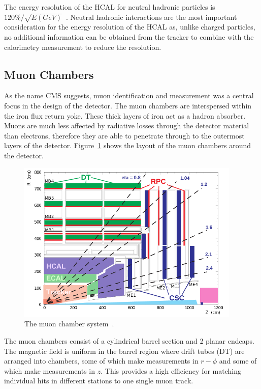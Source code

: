 The energy resolution of the HCAL for neutral hadronic particles is $120\%/\sqrt{E (GeV)}$~\cite{Beaudette:2014cea}. Neutral hadronic interactions are the most important consideration for the energy resolution of the HCAL as, unlike charged particles, no additional information can be obtained from the tracker to combine with the calorimetry measurement to reduce the resolution.

\subsection{Muon Chambers}
As the name CMS suggests, muon identification and measurement was a central focus in the design of the detector. The muon chambers are interspersed within the iron flux return yoke. These thick layers of iron act as a hadron absorber. Muons are much less affected by radiative losses through the detector material than electrons, therefore they are able to penetrate through to the outermost layers of the detector. Figure~\ref{fig:muonchamber} shows the layout of the muon chambers around the detector. 
\begin{figure}[ht!]
\centering
    \includegraphics[width=0.95\textwidth]{images/MuonChambers.png}
    \caption{The muon chamber system~\cite{Kim:2012ix}.}
    \label{fig:muonchamber}
\end{figure}
The muon chambers consist of a cylindrical barrel section and 2 planar endcaps. The magnetic field is uniform in the barrel region where drift tubes (DT) are arranged into chambers, some of which make measurements in $r-\phi$ and some of which make measurements in $z$. This provides a high efficiency for matching individual hits in different stations to one single muon track.
